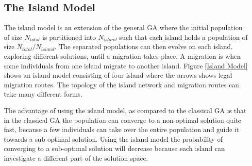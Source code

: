 %
%


\subsection{The Island Model}
The island model is an extension of the general GA where the initial population of size $N_{total}$ is partitioned into $N_{island}$ such that each island holds a population of size $N_{total} / N_{island}$. The separated populations can then evolve on each island, exploring different solutions, until a migration takes place. A migration is when some individuals from one island migrate to another island. Figure \ref{Island Model} shows an island model consisting of four island where the arrows shows legal migration routes. The topology of the island network and migration routes can take many different forms. 

The advantage of using the island model, as compared to the classical GA is that in the classical GA the population can converge to a non-optimal solution quite fast, because a few individuals can take over the entire population and guide it towards a sub-optimal solution. Using the island model the probability of converging to a sub-optimal solution will decrease because each island can investigate a different part of the solution space. 


